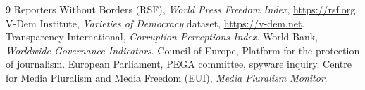 \documentclass[11pt]{article}
\begin{document}
\begin{thebibliography}{9}
 Reporters Without Borders (RSF), \emph{World Press Freedom Index}, \url{https://rsf.org}.
 V-Dem Institute, \emph{Varieties of Democracy} dataset, \url{https://v-dem.net}.
 Transparency International, \emph{Corruption Perceptions Index}.
 World Bank, \emph{Worldwide Governance Indicators}.
 Council of Europe, Platform for the protection of journalism.
 European Parliament, PEGA committee, spyware inquiry.
 Centre for Media Pluralism and Media Freedom (EUI), \emph{Media Pluralism Monitor}.
\end{thebibliography}
\end{document}
